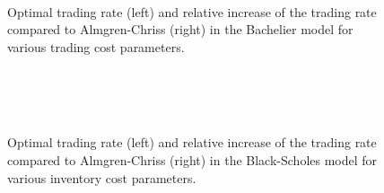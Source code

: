 \documentclass[11pt]{article}
\newlength\figheight
\newlength\figwidth
\theoremstyle{definition}
\theoremstyle{remark}
\begin{document}
\begin{figure}
 \setlength{}
 \setlength{}
 \centering
 \hspace{0.5em}
 \\
 \hspace{0.5em}
 \\
 \hspace{0.5em}
 \\
 \caption{Optimal trading rate (left) and relative increase of the trading rate compared to Almgren-Chriss (right) in the Bachelier model for various trading cost parameters.}
 \label{fig:ABM}
\end{figure}



\begin{figure}
 \setlength{}
 \setlength{}
 \centering
 \hspace{0.5em}
 \\
 \hspace{0.5em}
 \\
 \hspace{0.5em}
 \\
 \caption{Optimal trading rate (left) and relative increase of the trading rate compared to Almgren-Chriss (right) in the Black-Scholes model for various inventory cost parameters.}
 \label{fig:GBM}
\end{figure}






\end{document}

